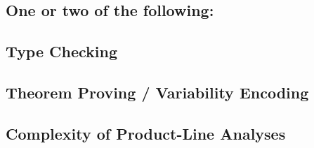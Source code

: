 
\subsection{One or two of the following:}

\subsection{Type Checking} %



\subsection{Theorem Proving / Variability Encoding}

\subsection{} %

\begin{frame}{}
\end{frame}

\subsection{Complexity of Product-Line Analyses} %


